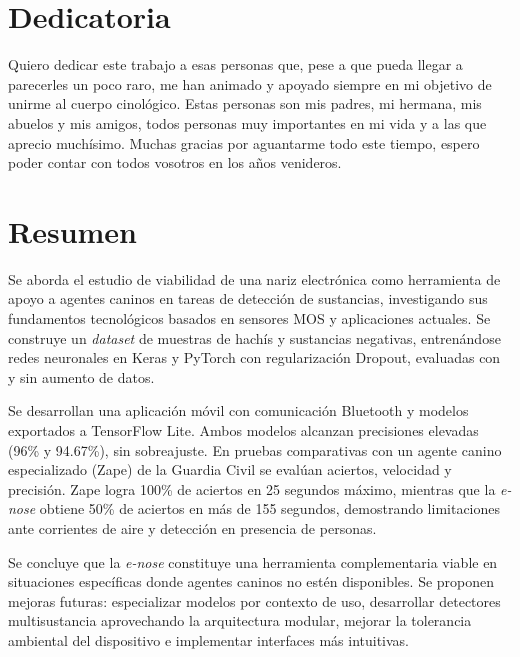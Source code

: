 \documentclass[hidelinks, headlogo, framedcover]{tfeEPCC}
\begin{document}
\newpage
\null%
\thispagestyle{empty}
\newpage

\chapter*{Dedicatoria} %
Quiero dedicar este trabajo a esas personas que, pese a que pueda llegar a parecerles un poco raro, me han animado y apoyado siempre en mi objetivo de unirme al cuerpo cinológico. Estas personas son mis padres, mi hermana, mis abuelos y mis amigos, todos personas muy importantes en mi vida y a las que aprecio muchísimo. Muchas gracias por aguantarme todo este tiempo, espero poder contar con todos vosotros en los años venideros.

\newpage
\null%
\thispagestyle{empty}
\newpage

\chapter*{Resumen}
Se aborda el estudio de viabilidad de una nariz electrónica como herramienta de apoyo a agentes caninos en tareas de detección de sustancias, investigando sus fundamentos tecnológicos basados en sensores MOS y aplicaciones actuales. Se construye un \textit{dataset} de muestras de hachís y sustancias negativas, entrenándose  redes neuronales en Keras y PyTorch con regularización Dropout, evaluadas con y sin aumento de datos.

Se desarrollan una aplicación móvil con comunicación Bluetooth y modelos exportados a TensorFlow Lite. Ambos modelos alcanzan precisiones elevadas (96\% y 94.67\%), sin sobreajuste. En pruebas comparativas con un agente canino especializado (Zape) de la Guardia Civil se evalúan aciertos, velocidad y precisión. Zape logra 100\% de aciertos en 25 segundos máximo, mientras que la \textit{e-nose} obtiene 50\% de aciertos en más de 155 segundos, demostrando limitaciones ante corrientes de aire y detección en presencia de personas.

Se concluye que la \textit{e-nose} constituye una herramienta complementaria viable en situaciones específicas donde agentes caninos no estén disponibles. Se proponen mejoras futuras: especializar modelos por contexto de uso, desarrollar detectores multisustancia aprovechando la arquitectura modular, mejorar la tolerancia ambiental del dispositivo e implementar interfaces más intuitivas.
\end{document}
